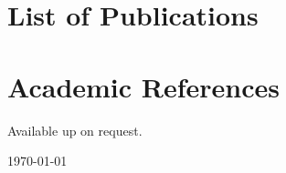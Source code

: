 \documentclass[12pt,a4paper]{moderncv}
\begin{document}
\newpage
\makecvtitle


\newpage
\section{List of Publications}




\newpage








\section{Academic References}
Available up on request.




\emptysection{}\closesection{}
\vfill 
 \hspace{2.75cm}
 \textcolor{color2}{\today} \hfill %
\end{document}

